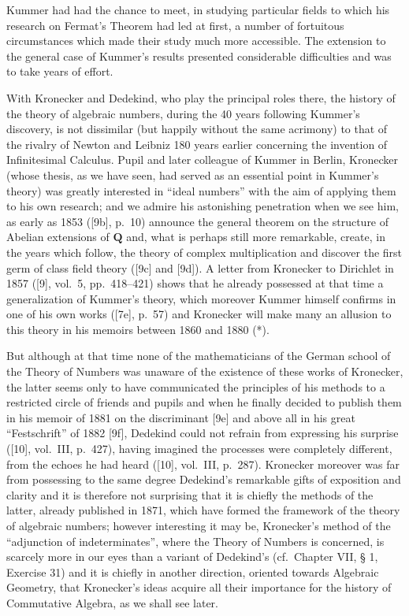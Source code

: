 Kummer had had the chance to meet, in studying particular fields to which his research on Fermat's Theorem had led at first, a number of fortuitous circumstances which made their study much more accessible. The extension to the general case of Kummer's results presented considerable difficulties and was to take years of effort.

With Kronecker and Dedekind, who play the principal roles there, the history of the theory of algebraic numbers, during the 40 years following Kummer's discovery, is not dissimilar (but happily without the same acrimony) to that of the rivalry of Newton and Leibniz 180 years earlier concerning the invention of Infinitesimal Calculus. Pupil and later colleague of Kummer in Berlin, Kronecker (whose thesis, as we have seen, had served as an essential point in Kummer's theory) was greatly interested in ``ideal numbers'' with the aim of applying them to his own research; and we admire his astonishing penetration when we see him, as early as 1853 ({[}9b{]}, p.~10) announce the general theorem on the structure of Abelian extensions of \(\mathbf{Q}\) and, what is perhaps still more remarkable, create, in the years which follow, the theory of complex multiplication and discover the first germ of class field theory ({[}9c{]} and {[}9d{]}). A letter from Kronecker to Dirichlet in 1857 ({[}9{]}, vol.~5, pp.~418--421) shows that he already possessed at that time a generalization of Kummer's theory, which moreover Kummer himself confirms in one of his own works ({[}7e{]}, p.~57) and Kronecker will make many an allusion to this theory in his memoirs between 1860 and 1880 (*).

But although at that time none of the mathematicians of the German school of the Theory of Numbers was unaware of the existence of these works of Kronecker, the latter seems only to have communicated the principles of his methods to a restricted circle of friends and pupils and when he finally decided to publish them in his memoir of 1881 on the discriminant {[}9e{]} and above all in his great ``Festschrift'' of 1882 {[}9f{]}, Dedekind could not refrain from expressing his surprise ({[}10{]}, vol.~III, p.~427), having imagined the processes were completely different, from the echoes he had heard ({[}10{]}, vol.~III, p.~287). Kronecker moreover was far from possessing to the same degree Dedekind's remarkable gifts of exposition and clarity and it is therefore not surprising that it is chiefly the methods of the latter, already published in 1871, which have formed the framework of the theory of algebraic numbers; however interesting it may be, Kronecker's method of the ``adjunction of indeterminates'', where the Theory of Numbers is concerned, is scarcely more in our eyes than a variant of Dedekind's (cf.~Chapter VII, § 1, Exercise 31) and it is chiefly in another direction, oriented towards Algebraic Geometry, that Kronecker's ideas acquire all their importance for the history of Commutative Algebra, as we shall see later.

